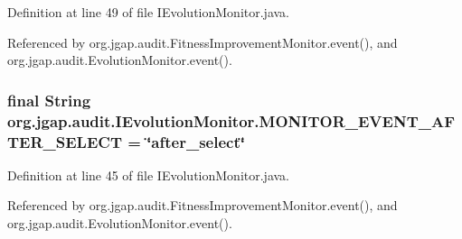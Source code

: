 Definition at line 49 of file I\-Evolution\-Monitor.\-java.



Referenced by org.\-jgap.\-audit.\-Fitness\-Improvement\-Monitor.\-event(), and org.\-jgap.\-audit.\-Evolution\-Monitor.\-event().

\hypertarget{interfaceorg_1_1jgap_1_1audit_1_1_i_evolution_monitor_a2c7a5270a8d8bbbf8ebec5a912c42ee5}{
\subsubsection[{M\-O\-N\-I\-T\-O\-R\-\_\-\-E\-V\-E\-N\-T\-\_\-\-A\-F\-T\-E\-R\-\_\-\-S\-E\-L\-E\-C\-T}]{\setlength{\rightskip}{0pt plus 5cm}final String org.\-jgap.\-audit.\-I\-Evolution\-Monitor.\-M\-O\-N\-I\-T\-O\-R\-\_\-\-E\-V\-E\-N\-T\-\_\-\-A\-F\-T\-E\-R\-\_\-\-S\-E\-L\-E\-C\-T = \char`\"{}after\-\_\-select\char`\"{}\hspace{0.3cm}{\ttfamily [static]}}}\label{interfaceorg_1_1jgap_1_1audit_1_1_i_evolution_monitor_a2c7a5270a8d8bbbf8ebec5a912c42ee5}


Definition at line 45 of file I\-Evolution\-Monitor.\-java.



Referenced by org.\-jgap.\-audit.\-Fitness\-Improvement\-Monitor.\-event(), and org.\-jgap.\-audit.\-Evolution\-Monitor.\-event().

